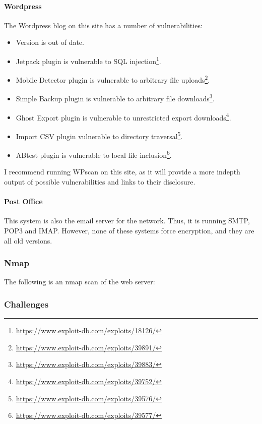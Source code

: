 				\paragraph{Wordpress}
					The Wordpress blog on this site has a number of vulnerabilities:
						\begin{itemize}
							\item Version is out of date.
							\item Jetpack plugin is vulnerable to SQL injection\footnote{\url{https://www.exploit-db.com/exploits/18126/}}.
							\item Mobile Detector plugin is vulnerable to arbitrary file uploads\footnote{\url{https://www.exploit-db.com/exploits/39891/}}.
							\item Simple Backup plugin is vulnerable to arbitrary file downloads\footnote{\url{https://www.exploit-db.com/exploits/39883/}}.
							\item Ghost Export plugin is vulnerable to unrestricted export downloads\footnote{\url{https://www.exploit-db.com/exploits/39752/}}.
							\item Import CSV plugin vulnerable to directory traversal\footnote{\url{https://www.exploit-db.com/exploits/39576/}}.
							\item ABtest plugin is vulnerable to local file inclusion\footnote{\url{https://www.exploit-db.com/exploits/39577/}}.
						\end{itemize}
					I recommend running WPscan on this site, as it will provide a more indepth output of possible vulnerabilities and links to their disclosure.

				\paragraph{Post Office}
					This system is also the email server for the network.
					Thus, it is running SMTP, POP3 and IMAP.
					However, none of these systems force encryption, and they are all old versions.

			\subsubsection{Nmap}
				The following is an nmap scan of the web server:


			\subsubsection{Challenges}
